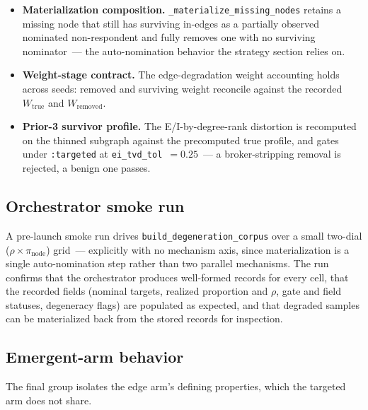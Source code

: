 \documentclass[11pt]{article}
\newcommand{\pinode}{\pi_{\text{node}}}
\begin{document}
\begin{itemize}[leftmargin=*, itemsep=3pt]
  \item \textbf{Materialization composition.} \texttt{\_materialize\_missing\_nodes} retains a missing node that still has surviving in-edges as a partially observed nominated non-respondent and fully removes one with no surviving nominator~--- the auto-nomination behavior the strategy section relies on.
  \item \textbf{Weight-stage contract.} The edge-degradation weight accounting holds across seeds: removed and surviving weight reconcile against the recorded $W_{\text{true}}$ and $W_{\text{removed}}$.
  \item \textbf{Prior-3 survivor profile.} The E/I-by-degree-rank distortion is recomputed on the thinned subgraph against the precomputed true profile, and gates under \texttt{:targeted} at \texttt{ei\_tvd\_tol}~$= 0.25$~--- a broker-stripping removal is rejected, a benign one passes.
\end{itemize}

\subsection{Orchestrator smoke run}

A pre-launch smoke run drives \texttt{build\_degeneration\_corpus} over a small two-dial ($\rho \times \pinode$) grid~--- explicitly with no mechanism axis, since materialization is a single auto-nomination step rather than two parallel mechanisms. The run confirms that the orchestrator produces well-formed records for every cell, that the recorded fields (nominal targets, realized proportion and $\rho$, gate and field statuses, degeneracy flags) are populated as expected, and that degraded samples can be materialized back from the stored records for inspection.

\subsection{Emergent-arm behavior}

The final group isolates the edge arm's defining properties, which the targeted arm does not share.
\end{document}
